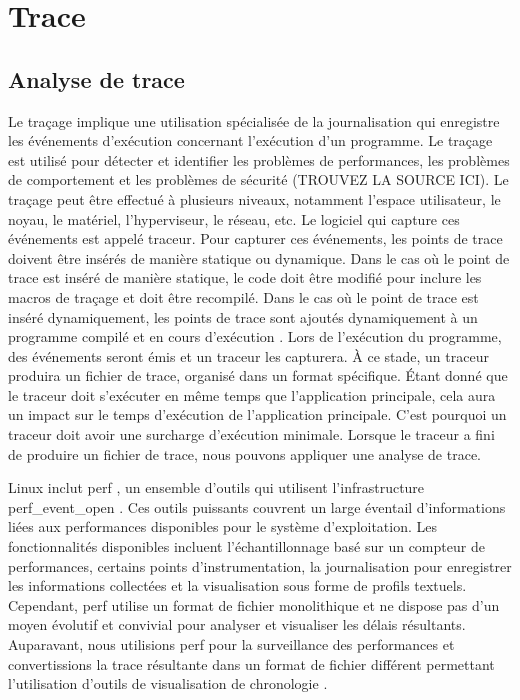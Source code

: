\label{sec:RevLitt}

\section{Trace}

\subsection{Analyse de trace}

Le traçage implique une utilisation spécialisée de la journalisation qui enregistre les événements d'exécution concernant l'exécution d'un programme. Le traçage est utilisé pour détecter et identifier les problèmes de performances, les problèmes de comportement et les problèmes de sécurité (TROUVEZ LA SOURCE ICI). Le traçage peut être effectué à plusieurs niveaux, notamment l'espace utilisateur, le noyau, le matériel, l'hyperviseur, le réseau, etc. Le logiciel qui capture ces événements est appelé traceur. Pour capturer ces événements, les points de trace doivent être insérés de manière statique ou dynamique. Dans le cas où le point de trace est inséré de manière statique, le code doit être modifié pour inclure les macros de traçage et doit être recompilé. Dans le cas où le point de trace est inséré dynamiquement, les points de trace sont ajoutés dynamiquement à un programme compilé et en cours d'exécution \cite{gregg2011dtrace}. Lors de l'exécution du programme, des événements seront émis et un traceur les capturera. À ce stade, un traceur produira un fichier de trace, organisé dans un format spécifique. Étant donné que le traceur doit s'exécuter en même temps que l'application principale, cela aura un impact sur le temps d'exécution de l'application principale. C'est pourquoi un traceur doit avoir une surcharge d'exécution minimale. Lorsque le traceur a fini de produire un fichier de trace, nous pouvons appliquer une analyse de trace.

Linux inclut perf \cite{kernelPerfWiki}, un ensemble d'outils qui utilisent l'infrastructure perf\_event\_open \cite{man7Perf}. Ces outils puissants couvrent un large éventail d'informations liées aux performances disponibles pour le système d'exploitation. Les fonctionnalités disponibles incluent l'échantillonnage basé sur un compteur de performances, certains points d'instrumentation, la journalisation pour enregistrer les informations collectées et la visualisation sous forme de profils textuels. Cependant, perf utilise un format de fichier monolithique et ne dispose pas d'un moyen évolutif et convivial pour analyser et visualiser les délais résultants. Auparavant, nous utilisions perf pour la surveillance des performances et convertissions la trace résultante dans un format de fichier différent permettant l'utilisation d'outils de visualisation de chronologie \cite{schone2014scalable}.

